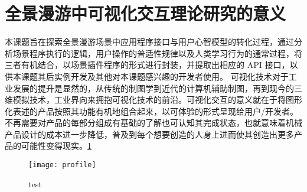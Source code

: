 \section{全景漫游中可视化交互理论研究的意义}
本课题旨在探索全景漫游场景中应用程序接口与用户心智模型的转化过程，通过分析场景程序执行的逻辑，用户操作的普适性规律以及人类学习行为的通常过程，将三者有机结合，以场景插件程序的形式进行封装，并提取出相应的 API 接口，以供本课题其后实例开发及其他对本课题感兴趣的开发者使用。
可视化技术对于工业发展的提升是显然的，从传统的制图学到近代的计算机辅助制图，再到现今的三维模拟技术，工业界向来拥抱可视化技术的前沿。可视化交互的意义就在于将图形化表述的产品按照其功能有机地组合起来，以可体验的形式呈现给用户/开发者。不再需要对产品的每部分组成有基础的了解也可认知其完成状态，也就意味着机械产品设计的成本进一步降低，普及到每个想要创造的人身上进而使其创造出更多产品的可能性变得现实。\ref{fig:test}

\begin{figure}[htp]
\centering
\texttt{[image: profile]}
\label{fig:test}
\caption{test}
\end{figure}